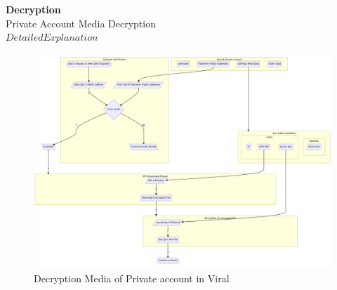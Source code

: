 \documentclass[10pt]{article}
\begin{document}

\textbf{Decryption}\\

Private Account Media Decryption\\

$Detailed Explanation$\\

\begin{figure}[H]
\begin{center}
\includegraphics[width=\textwidth]{decryption-private}
\caption{Decryption Media of Private account in Viral}
\end{center}
\end{figure}
\end{document}
